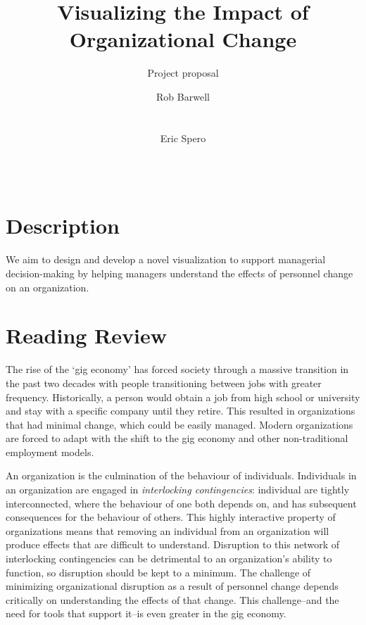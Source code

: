 \documentclass{soups}
\title{Visualizing the Impact of Organizational Change}
\subtitle{Project proposal}
\author{
\alignauthor
Rob Barwell\\ %
       \affaddr{Carleton University}\\
       \affaddr{Ottawa, Canada}\\
       \email{rob@barwell.ca}
\alignauthor
Eric Spero\\ %
       \affaddr{Carleton University}\\
       \affaddr{Ottawa, Canada }\\
       \email{eric.spero@carleton.ca}
}
\begin{document}
\nobalance

\makeatletter
\def\@copyrightspace{\relax}
\makeatother

\maketitle

\section{Description}

We aim to design and develop a novel visualization to support managerial decision-making by helping managers understand the effects of personnel change on an organization.

\section{Reading Review}

The rise of the \lq gig economy\rq{}\cite{de2015rise,friedman2014workers} has forced society through a massive transition in the past two decades with people transitioning between jobs with greater frequency.  Historically, a person would obtain a job from high school or university and stay with a specific company until they retire.  This resulted in organizations that had minimal change, which could be easily managed. Modern organizations are forced to adapt with the shift to the gig economy and other non-traditional employment models.  

An organization is the culmination of the behaviour of individuals. Individuals in an organization are engaged in \emph{interlocking contingencies}\cite{glenn2006complexity}: individual are tightly interconnected, where the behaviour of one both depends on, and has subsequent consequences for the behaviour of others\cite{glenn2006complexity}. This highly interactive property of organizations means that removing an individual from an organization will produce effects that are difficult to understand. Disruption to this network of interlocking contingencies can be detrimental to an organization's ability to function, so disruption should be kept to a minimum. The challenge of minimizing organizational disruption as a result of personnel change depends critically on understanding the effects of that change. This challenge--and the need for tools that support it--is even greater in the gig economy. 
\end{document}
